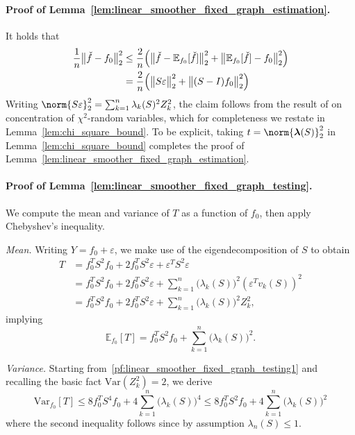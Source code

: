 \documentclass[twoside]{article}
\newcommand{\Var}{\mathrm{Var}}
\newcommand{\1}{\mathbf{1}}
\newcommand{\lambdavec}{\boldsymbol{\lambda}}
\newcommand{\Ebb}{\mathbb{E}}
\theoremstyle{definition}
\theoremstyle{remark}
\begin{document}
\paragraph{Proof of Lemma~\ref{lem:linear_smoother_fixed_graph_estimation}.}
It holds that
\begin{align*}
\frac{1}{n}\bigl\|\check{f} - f_0\bigr\|_2^2 & \leq \frac{2}{n}\Bigl(\bigl\|\check{f} - \Ebb_{f_0}[\check{f}]\bigr\|_2^2 + \bigl\|\Ebb_{f_0}[\check{f}] - f_0\bigr\|_2^2\Bigr) \\ 
& = \frac{2}{n}\Bigl(\bigl\|S\varepsilon\bigr\|_2^2 + \bigl\|(S - I)f_0\bigr\|_2^2\Bigr)
\end{align*}
Writing $\norm{S\varepsilon}_2^2 = \sum_{k = 1}^{n} \lambda_k(S)^2 Z_k^2$, the claim follows from the result of \cite{laurent00} on concentration of $\chi^2$-random variables, which for completeness we restate in Lemma~\ref{lem:chi_square_bound}. To be explicit, taking $t = \norm{\lambdavec(S)}_2^2$ in Lemma~\ref{lem:chi_square_bound} completes the proof of Lemma~\ref{lem:linear_smoother_fixed_graph_estimation}. 

\paragraph{Proof of Lemma~\ref{lem:linear_smoother_fixed_graph_testing}.}
We compute the mean and variance of $T$ as a function of $f_0$, then apply Chebyshev's inequality.

\textit{Mean.} Writing $Y = f_0 + \varepsilon$, we make use of the eigendecomposition of $S$ to obtain
\begin{equation}
\label{pf:linear_smoother_fixed_graph_testing1}
\begin{aligned}
T & = f_0^T S^2 f_0 + 2 f_0^T S^2 \varepsilon + \varepsilon^T S^2 \varepsilon \\
& = f_0^T S^2 f_0 + 2 f_0^T S^2 \varepsilon + \sum_{k = 1}^{n}  \bigl(\lambda_k(S)\bigr)^2 (\varepsilon^T v_k(S))^2 \\
& = f_0^T S^2 f_0 + 2 f_0^T S^2 \varepsilon + \sum_{k = 1}^{n}  \bigl(\lambda_k(S)\bigr)^2 Z_k^2,
\end{aligned}
\end{equation}
implying
\begin{equation}
\label{pf:linear_smoother_fixed_graph_testing_mean}
\Ebb_{f_0}[T] = f_0^T S^2 f_0 + \sum_{k = 1}^{n} \bigl(\lambda_k(S)\bigr)^2.
\end{equation}

\textit{Variance.} Starting from~\eqref{pf:linear_smoother_fixed_graph_testing1} and recalling the basic fact $\Var(Z_k^2) = 2$, we derive
\begin{equation}
\label{pf:linear_smoother_fixed_graph_testing_var}
\Var_{f_0}[T] \leq 8 f_0^T S^4 f_0 + 4 \sum_{k = 1}^{n} \bigl(\lambda_k(S)\bigr)^4 \leq 8 f_0^T S^2 f_0 + 4 \sum_{k = 1}^{n} \bigl(\lambda_k(S)\bigr)^2
\end{equation}
where the second inequality follows since by assumption $\lambda_{n}(S) \leq 1$.
\end{document}
